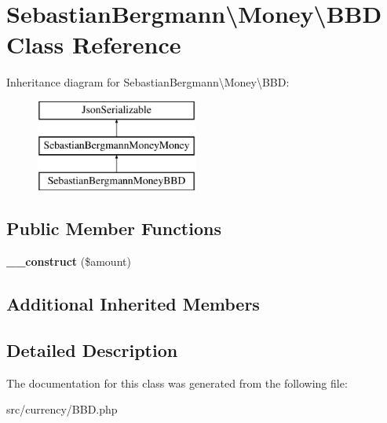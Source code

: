 \hypertarget{classSebastianBergmann_1_1Money_1_1BBD}{}\section{Sebastian\+Bergmann\textbackslash{}Money\textbackslash{}B\+B\+D Class Reference}
\label{classSebastianBergmann_1_1Money_1_1BBD}
Inheritance diagram for Sebastian\+Bergmann\textbackslash{}Money\textbackslash{}B\+B\+D\+:\begin{figure}[H]
\begin{center}
\leavevmode
\includegraphics[height=3.000000cm]{classSebastianBergmann_1_1Money_1_1BBD}
\end{center}
\end{figure}
\subsection*{Public Member Functions}
\begin{DoxyCompactItemize}
\item 
\hypertarget{classSebastianBergmann_1_1Money_1_1BBD_aef136a9a7220688cb9708025de0e4fcf}{}{\bfseries \+\_\+\+\_\+construct} (\$amount)\label{classSebastianBergmann_1_1Money_1_1BBD_aef136a9a7220688cb9708025de0e4fcf}

\end{DoxyCompactItemize}
\subsection*{Additional Inherited Members}


\subsection{Detailed Description}


The documentation for this class was generated from the following file\+:\begin{DoxyCompactItemize}
\item 
src/currency/B\+B\+D.\+php\end{DoxyCompactItemize}
